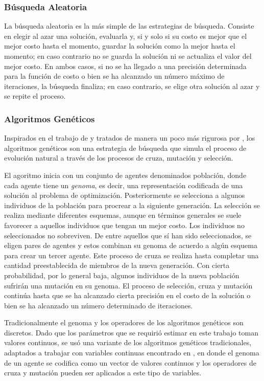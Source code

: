\subsubsection{Búsqueda Aleatoria}

La búsqueda aleatoria es la más simple de las estrategias de búsqueda. Consiste en elegir al azar una solución, evaluarla y, si y solo si su costo es mejor que el mejor costo hasta el momento, guardar la solución como la mejor hasta el momento; en caso contrario no se guarda la solución ni se actualiza el valor del mejor costo. En ambos casos, si no se ha llegado a una precisión determinada para la función de costo o bien se ha alcanzado un número máximo de iteraciones, la búsqueda finaliza; en caso contrario, se elige otra solución al azar y se repite el proceso.

\subsubsection{Algoritmos Genéticos}

Inspirados en el trabajo de \citeauthor{holland1975} \citep{holland1975} y tratados de manera un poco más rigurosa por \citeauthor{Goldberg1989} \citep{Goldberg1989}, los algoritmos genéticos son una estrategia de búsqueda que simula el proceso de evolución natural a través de los procesos de cruza, mutación y selección.

El agoritmo inicia con un conjunto de agentes denominados población, donde cada agente tiene un \emph{genoma}, es decir, una representación codificada de una solución al problema de optimización. Posteriormente se selecciona a algunos individuos de la población para procrear a la siguiente generación. La selección se realiza mediante diferentes esquemas, aunque en términos generales se suele favorecer a aquellos individuos que tengan un mejor costo. Los individuos no seleccionados no sobreviven. De entre aquellos que sí han sido seleccionados, se eligen pares de agentes y estos combinan su genoma de acuerdo a algún esquema para crear un tercer agente. Este proceso de cruza se realiza hasta completar una cantidad preestablecida de miembros de la nueva generación. Con cierta probabilidad, por lo general baja, algunos individuos de la nueva población sufrirán una mutación en su genoma. El proceso de selección, cruza y mutación continúa hasta que se ha alcanzado cierta precisión en el costo de la solución o bien se ha alcanzado un número determinado de iteraciones.

Tradicionalmente el genoma y los operadores de los algoritmos genéticos son discretos. Dado que los parámetros que se requirió estimar en este trabajo toman valores continuos, se usó una variante de los algoritmos genéticos tradicionales, adaptados a trabajar con variables continuas encontrado en \citeauthor{Haupt1998} \citep{Haupt1998}, en donde el genoma de un agente se codifica como un vector de valores continuos y los operadores de cruza y mutación pueden ser aplicados a este tipo de variables.

